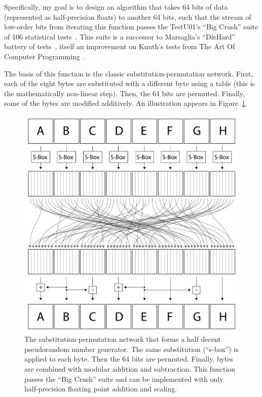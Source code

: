 \documentclass[twocolumn]{article}
\begin{document}
Specifically, my goal is to design an algorithm that takes 64 bits of
data (represented as half-precision floats) to another 64 bits, such
that the stream of low-order bits from iterating this function passes
the TestU01's ``Big Crush'' suite of 106 statistical
tests~\cite{lecuyer2007testu01}. This suite is a successor to
Marsaglia's ``DieHard'' battery of tests~\cite{marsaglia1996diehard},
itself an improvement on Knuth's tests from The Art Of Computer
Programming~\cite{knuth1997art}.

The basis of this function is the classic substitution-permutation
network. First, each of the eight bytes are substituted with a
different byte using a table (this is the mathematically non-linear
step). Then, the 64 bits are permuted. Finally, some of the bytes are
modified additively. An illustration appears in Figure~\ref{fig:cipher}.

\begin{figure}[htp]
  \begin{center}
    \includegraphics[width=\linewidth]{cipher}
  \end{center}
  \caption{The substitution-permutation network that forms a half decent
    pseudorandom number generator. The same substitution (``s-box'') is
    applied to each byte. Then the 64 bits are permuted. Finally, bytes
    are combined with modular addition and subtraction. This function
    passes the ``Big Crush'' suite and can be implemented with only
    half-precision floating point addition and scaling.
  } \label{fig:cipher}
\end{figure}
\end{document}
